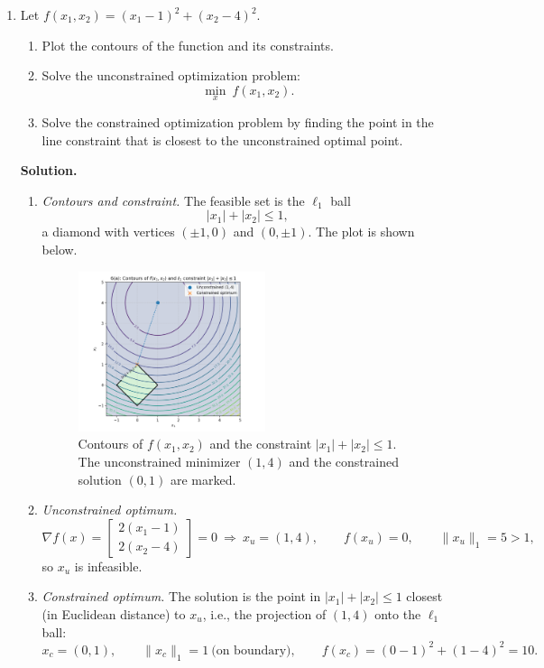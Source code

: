 \documentclass[11pt]{article}
\begin{document}
\begin{enumerate}[label=6(\alph*)]
	\item Let $f(x_1,x_2)=(x_1-1)^2+(x_2-4)^2$.
	\begin{enumerate}[label=\arabic*)]
		\item Plot the contours of the function and its constraints.
		\item Solve the unconstrained optimization problem:
		\[
		\min_{x}\ f(x_1,x_2). \tag{20}
		\]
		\item Solve the constrained optimization problem by finding the point in the line
		constraint that is closest to the unconstrained optimal point.
	\end{enumerate}

	\textbf{Solution.}
	
	\begin{enumerate}[label=\arabic*)]
		\item \emph{Contours and constraint.} The feasible set is the $\ell_1$ ball
		\[
		|x_1|+|x_2|\le 1,
		\]
		a diamond with vertices $(\pm 1,0)$ and $(0,\pm 1)$. The plot is shown below.
		
		\begin{figure}[H]
			\centering
			\includegraphics[width=0.55\textwidth]{6a.png}
			\caption{Contours of $f(x_1,x_2)$ and the constraint $|x_1|+|x_2|\le 1$. The unconstrained minimizer $(1,4)$ and the constrained solution $(0,1)$ are marked.}
		\end{figure}
		
		\item \emph{Unconstrained optimum.} 
		\[
		\nabla f(x)=\begin{bmatrix}2(x_1-1)\\ 2(x_2-4)\end{bmatrix}=0
		\ \Rightarrow\ x_u=(1,4),\qquad f(x_u)=0,\qquad \|x_u\|_1=5>1,
		\]
		so $x_u$ is infeasible.
		
		\item \emph{Constrained optimum.} The solution is the point in $|x_1|+|x_2|\le 1$ closest (in Euclidean distance) to $x_u$, i.e., the projection of $(1,4)$ onto the $\ell_1$ ball:
		\[
		x_c=(0,1),\qquad \|x_c\|_1=1\ \text{(on boundary)},\qquad f(x_c)=(0-1)^2+(1-4)^2=10.
		\]
	\end{enumerate}


\end{enumerate}
\end{document}
